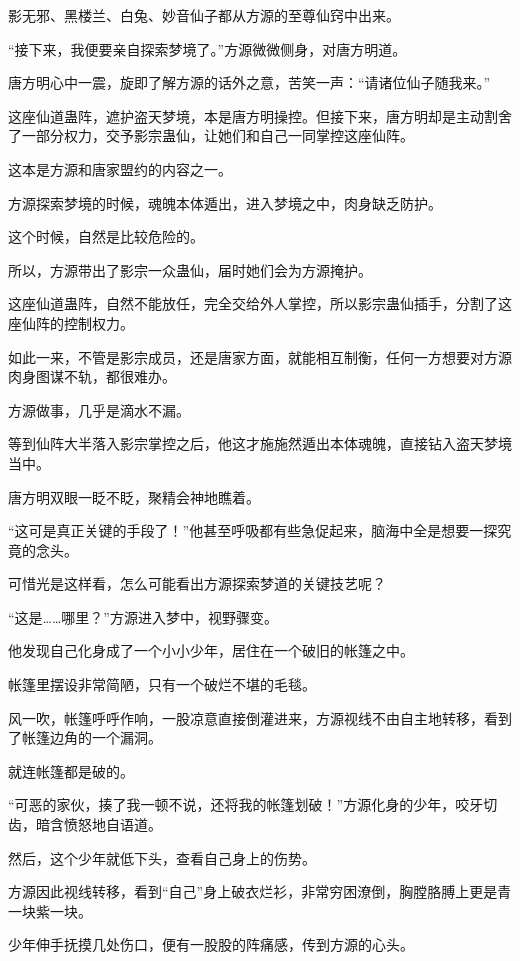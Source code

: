 
\begin{this_body}

影无邪、黑楼兰、白兔、妙音仙子都从方源的至尊仙窍中出来。

“接下来，我便要亲自探索梦境了。”方源微微侧身，对唐方明道。

唐方明心中一震，旋即了解方源的话外之意，苦笑一声：“请诸位仙子随我来。”

这座仙道蛊阵，遮护盗天梦境，本是唐方明操控。但接下来，唐方明却是主动割舍了一部分权力，交予影宗蛊仙，让她们和自己一同掌控这座仙阵。

这本是方源和唐家盟约的内容之一。

方源探索梦境的时候，魂魄本体遁出，进入梦境之中，肉身缺乏防护。

这个时候，自然是比较危险的。

所以，方源带出了影宗一众蛊仙，届时她们会为方源掩护。

这座仙道蛊阵，自然不能放任，完全交给外人掌控，所以影宗蛊仙插手，分割了这座仙阵的控制权力。

如此一来，不管是影宗成员，还是唐家方面，就能相互制衡，任何一方想要对方源肉身图谋不轨，都很难办。

方源做事，几乎是滴水不漏。

等到仙阵大半落入影宗掌控之后，他这才施施然遁出本体魂魄，直接钻入盗天梦境当中。

唐方明双眼一眨不眨，聚精会神地瞧着。

“这可是真正关键的手段了！”他甚至呼吸都有些急促起来，脑海中全是想要一探究竟的念头。

可惜光是这样看，怎么可能看出方源探索梦道的关键技艺呢？

“这是……哪里？”方源进入梦中，视野骤变。

他发现自己化身成了一个小小少年，居住在一个破旧的帐篷之中。

帐篷里摆设非常简陋，只有一个破烂不堪的毛毯。

风一吹，帐篷呼呼作响，一股凉意直接倒灌进来，方源视线不由自主地转移，看到了帐篷边角的一个漏洞。

就连帐篷都是破的。

“可恶的家伙，揍了我一顿不说，还将我的帐篷划破！”方源化身的少年，咬牙切齿，暗含愤怒地自语道。

然后，这个少年就低下头，查看自己身上的伤势。

方源因此视线转移，看到“自己”身上破衣烂衫，非常穷困潦倒，胸膛胳膊上更是青一块紫一块。

少年伸手抚摸几处伤口，便有一股股的阵痛感，传到方源的心头。


\end{this_body}
